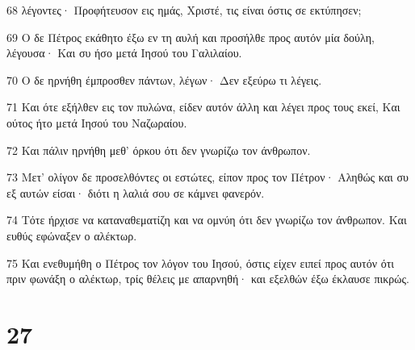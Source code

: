 \par 68 λέγοντες· Προφήτευσον εις ημάς, Χριστέ, τις είναι όστις σε εκτύπησεν;
\par 69 Ο δε Πέτρος εκάθητο έξω εν τη αυλή και προσήλθε προς αυτόν μία δούλη, λέγουσα· Και συ ήσο μετά Ιησού του Γαλιλαίου.
\par 70 Ο δε ηρνήθη έμπροσθεν πάντων, λέγων· Δεν εξεύρω τι λέγεις.
\par 71 Και ότε εξήλθεν εις τον πυλώνα, είδεν αυτόν άλλη και λέγει προς τους εκεί, Και ούτος ήτο μετά Ιησού του Ναζωραίου.
\par 72 Και πάλιν ηρνήθη μεθ' όρκου ότι δεν γνωρίζω τον άνθρωπον.
\par 73 Μετ' ολίγον δε προσελθόντες οι εστώτες, είπον προς τον Πέτρον· Αληθώς και συ εξ αυτών είσαι· διότι η λαλιά σου σε κάμνει φανερόν.
\par 74 Τότε ήρχισε να καταναθεματίζη και να ομνύη ότι δεν γνωρίζω τον άνθρωπον. Και ευθύς εφώναξεν ο αλέκτωρ.
\par 75 Και ενεθυμήθη ο Πέτρος τον λόγον του Ιησού, όστις είχεν ειπεί προς αυτόν ότι πριν φωνάξη ο αλέκτωρ, τρίς θέλεις με απαρνηθή· και εξελθών έξω έκλαυσε πικρώς.

\chapter{27}

